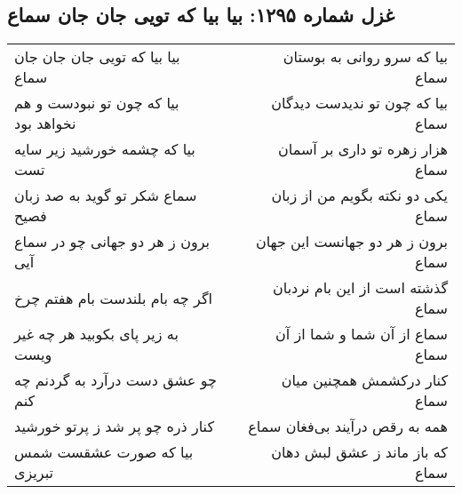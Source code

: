 \begin{center}
\section*{غزل شماره ۱۲۹۵: بیا بیا که تویی جان جان سماع}
\label{sec:1295}
\begin{longtable}{l p{0.5cm} r}
بیا بیا که تویی جان جان جان سماع
&&
بیا که سرو روانی به بوستان سماع
\\
بیا که چون تو نبودست و هم نخواهد بود
&&
بیا که چون تو ندیدست دیدگان سماع
\\
بیا که چشمه خورشید زیر سایه تست
&&
هزار زهره تو داری بر آسمان سماع
\\
سماع شکر تو گوید به صد زبان فصیح
&&
یکی دو نکته بگویم من از زبان سماع
\\
برون ز هر دو جهانی چو در سماع آیی
&&
برون ز هر دو جهانست این جهان سماع
\\
اگر چه بام بلندست بام هفتم چرخ
&&
گذشته است از این بام نردبان سماع
\\
به زیر پای بکوبید هر چه غیر ویست
&&
سماع از آن شما و شما از آن سماع
\\
چو عشق دست درآرد به گردنم چه کنم
&&
کنار درکشمش همچنین میان سماع
\\
کنار ذره چو پر شد ز پرتو خورشید
&&
همه به رقص درآیند بی‌فغان سماع
\\
بیا که صورت عشقست شمس تبریزی
&&
که باز ماند ز عشق لبش دهان سماع
\\
\end{longtable}
\end{center}
